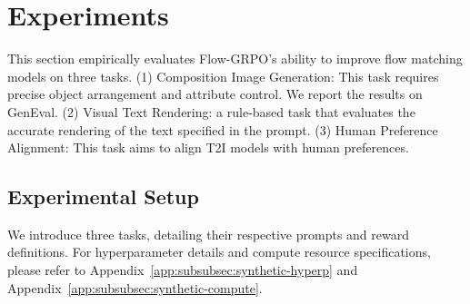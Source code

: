 \section{Experiments}\label{sec:exp}
This section empirically evaluates Flow-GRPO's ability to improve flow matching models on three tasks.
(1) Composition Image Generation: This task requires precise object arrangement and attribute control. We report the results on GenEval. (2) Visual Text Rendering: a rule‑based task that evaluates the accurate rendering of the text specified in the prompt. (3) Human Preference Alignment: This task aims to align T2I models with human preferences.


\subsection{Experimental Setup}
\label{sec:exp_setup}
We introduce three tasks, detailing their respective prompts and reward definitions. For hyperparameter details and compute resource specifications, please refer to Appendix~\ref{app:subsubsec:synthetic-hyperp} and Appendix~\ref{app:subsubsec:synthetic-compute}.


